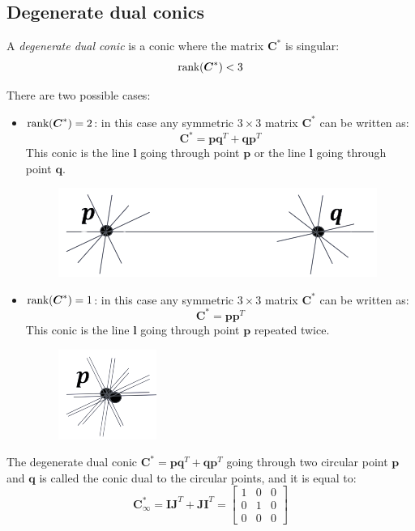 \documentclass[12pt, a4paper]{report}
\begin{document}
    \subsection{Degenerate dual conics}
    \begin{definition}
        A \emph{degenerate dual conic} is a conic where the matrix $\boldsymbol{C}^{*}$ is singular: \[\textnormal{rank}(\boldsymbol{C}^{*}) < 3\]
    \end{definition}
    There are two possible cases: 
    \begin{itemize}
        \item $\textnormal{rank}(\boldsymbol{C}^{*}) = 2$: in this case any symmetric $3 \times 3$ matrix $\boldsymbol{C}^{*}$ can be written as:
            \[\boldsymbol{C}^{*}=\boldsymbol{pq}^T+\boldsymbol{qp}^T\]
            This conic is the line $\boldsymbol{l}$ going through point $\boldsymbol{p}$ or the line $\boldsymbol{l}$ going through point $\boldsymbol{q}$. 
            \begin{figure}[H]
                \centering
                \includegraphics[width=0.5\linewidth]{images/deg2.png}
            \end{figure}
        \item $\textnormal{rank}(\boldsymbol{C}^{*}) = 1$: in this case any symmetric $3 \times 3$ matrix $\boldsymbol{C}^{*}$ can be written as:
            \[\boldsymbol{C}^{*}=\boldsymbol{pp}^T\]
            This conic is the line $\boldsymbol{l}$ going through point $\boldsymbol{p}$ repeated twice. 
            \begin{figure}[H]
                \centering
                \includegraphics[width=0.2\linewidth]{images/deg1.png}
            \end{figure}
    \end{itemize}

    \begin{definition}
        The degenerate dual conic $\boldsymbol{C}^{*}=\boldsymbol{pq}^T+\boldsymbol{qp}^T$ going through two circular point $\boldsymbol{p}$ and $\boldsymbol{q}$ is called the conic dual to the 
        circular points, and it is equal to: 
        \[\boldsymbol{C}^{*}_{\infty}=\boldsymbol{IJ}^{T}+\boldsymbol{JI}^{T}=
        \begin{bmatrix}
            1 & 0 & 0 \\
            0 & 1 & 0 \\
            0 & 0 & 0 
        \end{bmatrix}\]
    \end{definition}
\end{document}
